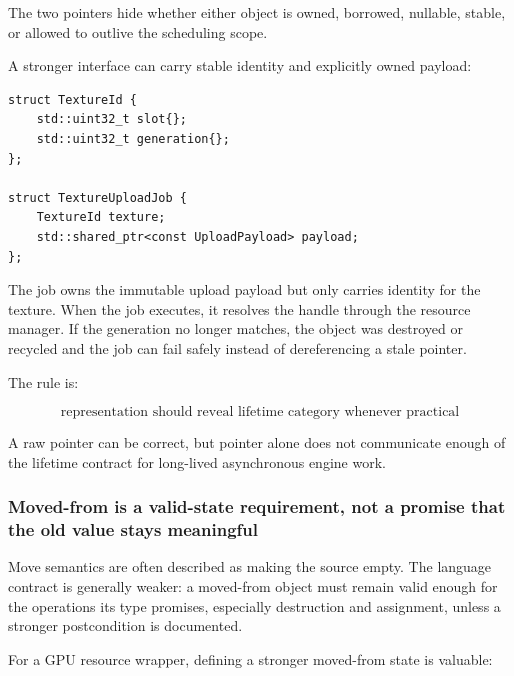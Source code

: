 The two pointers hide whether either object is owned, borrowed, nullable, stable, or allowed to outlive the scheduling scope.

A stronger interface can carry stable identity and explicitly owned payload:

\begin{verbatim}
struct TextureId {
    std::uint32_t slot{};
    std::uint32_t generation{};
};

struct TextureUploadJob {
    TextureId texture;
    std::shared_ptr<const UploadPayload> payload;
};
\end{verbatim}

The job owns the immutable upload payload but only carries identity for the texture. When the job executes, it resolves the handle through the resource manager. If the generation no longer matches, the object was destroyed or recycled and the job can fail safely instead of dereferencing a stale pointer.

The rule is:

\[
\boxed{
\text{representation should reveal lifetime category whenever practical}
}
\]

A raw pointer can be correct, but pointer alone does not communicate enough of the lifetime contract for long-lived asynchronous engine work.

\subsubsection{Moved-from is a valid-state requirement, not a promise that the old value stays meaningful}\label{01-foundations-i-ch005-moved-from-is-a-valid-state-requirement-not-a-promise-that-the-old-value-stays-meaningful}

\hypertarget{01-foundations-i-ch005-moved-from-is-a-valid-state-requirement-not-a-promise-that-the-old-value-stays-meaningful}{}

Move semantics are often described as making the source empty. The language contract is generally weaker: a moved-from object must remain valid enough for the operations its type promises, especially destruction and assignment, unless a stronger postcondition is documented.

For a GPU resource wrapper, defining a stronger moved-from state is valuable:

